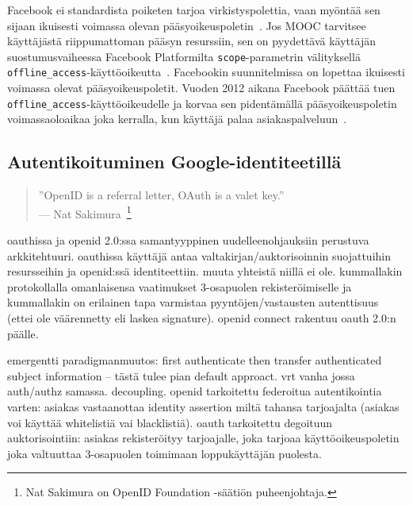 \documentclass[finnish,gradu]{tktltiki}
\begin{document}
  Facebook ei standardista poiketen tarjoa virkistyspolettia, vaan myöntää sen sijaan ikuisesti voimassa olevan pääsyoikeuspoletin~\cite{facebook_oauth2_doc}. Jos MOOC tarvitsee käyttäjästä riippumattoman pääsyn resurssiin, sen on pyydettävä käyttäjän suostumusvaiheessa Facebook Platformilta \verb!scope!-parametrin välityksellä \verb!offline_access!-käyttöoikeutta~\cite{facebook_oauth2_doc}. Facebookin suunnitelmissa on lopettaa ikuisesti voimassa olevat pääsyoikeuspoletit. Vuoden 2012 aikana Facebook päättää tuen \verb!offline_access!-käyttöoikeudelle ja korvaa sen pidentämällä pääsyoikeuspoletin voimassaoloaikaa joka kerralla, kun käyttäjä palaa asiakaspalveluun~\cite{facebook_oauth2_deprecate_offline}.





  \subsection{Autentikoituminen Google-identiteetillä} %
  \label{sub:mooc_google_auth}
  \begin{quote}
    ''OpenID is a referral letter, OAuth is a valet key.''
    \\--- Nat Sakimura~\cite{sakimura_dummydiff_oauth_openid_2011}\footnote{Nat Sakimura on OpenID Foundation -säätiön puheenjohtaja.}
  \end{quote}

  oauthissa ja openid 2.0:ssa samantyyppinen uudelleenohjauksiin perustuva arkkitehtuuri. oauthissa käyttäjä antaa valtakirjan/auktorisoinnin suojattuihin resursseihin ja openid:ssä identiteettiin. muuta yhteistä niillä ei ole. kummallakin protokollalla omanlaisensa vaatimukset 3-osapuolen rekisteröimiselle ja kummallakin on erilainen tapa varmistaa pyyntöjen/vastausten autenttisuus (ettei ole väärennetty eli laskea signature). openid connect rakentuu oauth 2.0:n päälle.

  emergentti paradigmanmuutos: first authenticate then transfer authenticated subject information -- tästä tulee pian default approact. vrt vanha jossa auth/authz samassa. decoupling.
  openid tarkoitettu federoitua autentikointia varten: asiakas vastaanottaa identity assertion miltä tahansa tarjoajalta (asiakas voi käyttää whitelistiä vai blacklistiä).
  oauth tarkoitettu degoituun auktorisointiin: asiakas rekisteröityy tarjoajalle, joka tarjoaa käyttöoikeuspoletin joka valtuuttaa 3-osapuolen toimimaan loppukäyttäjän puolesta.
\end{document}
